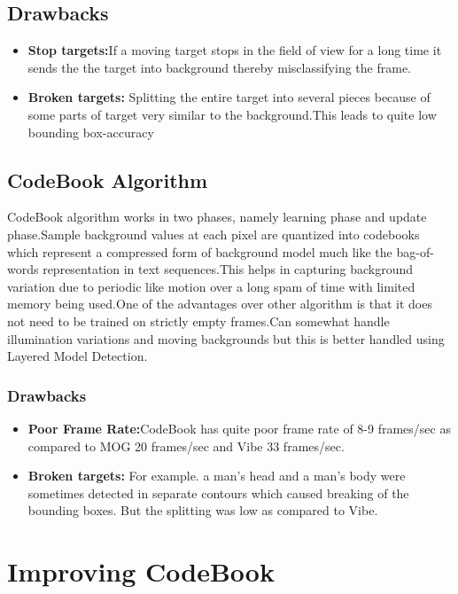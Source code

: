 \documentclass[12pt,a4paper]{report}
\begin{document}
\subsection{Drawbacks}
\begin{itemize}
\item {\bf Stop targets:}If a moving target stops in the field of view for a long time it sends the the target into background thereby misclassifying the frame.
\item {\bf Broken targets:} Splitting the entire target into several pieces because of some parts of target very similar to the background.This leads to quite low bounding box-accuracy  
\end{itemize} 

\subsection*{CodeBook Algorithm}
CodeBook algorithm works in two phases, namely learning phase and update phase.Sample background values at each pixel are quantized into codebooks which represent a compressed form of background model much like the bag-of-words representation in text sequences.This helps in capturing background variation due to periodic like motion over a long spam of time with limited memory being used.One of the advantages over other algorithm is that it does not need to be trained on strictly empty frames.Can somewhat handle illumination variations and moving backgrounds but this is better handled using Layered Model Detection.
\subsubsection*{Drawbacks}
\begin{itemize}
\item {\bf Poor Frame Rate:}CodeBook has quite poor frame rate of 8-9 frames/sec as compared to MOG 20 frames/sec and Vibe
33 frames/sec. 
\item {\bf Broken targets:} For example. a man's head and a man's body were sometimes detected in separate contours which caused breaking of the bounding boxes. But the splitting was low as compared to Vibe.
\end{itemize} 

\section*{Improving CodeBook}
\end{document}
